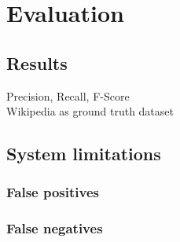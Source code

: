 \section{Evaluation}
\subsection{Results}
Precision, Recall, F-Score\\
Wikipedia as ground truth dataset

\subsection{System limitations}
\subsubsection{False positives}
\subsubsection{False negatives}